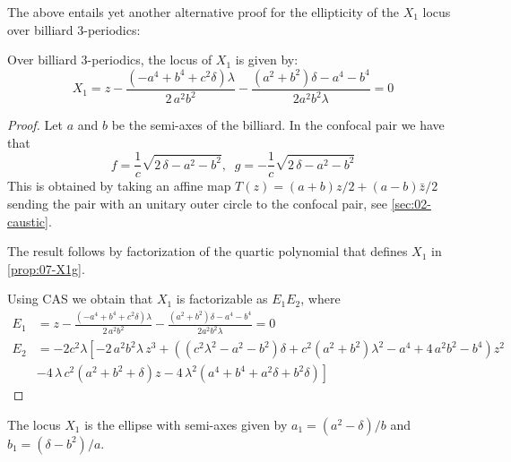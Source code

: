
The above entails yet another alternative proof for the ellipticity of the $X_1$ locus over billiard 3-periodics:

\begin{corollary}
Over billiard 3-periodics, the locus of $X_1$ is given by:
 \[   X_1 =z-{\frac { \left( -{a}^{4}+{b}^{4}+{c}^{2}\delta \right) \lambda}{2\,{a
}^{2}{b}^{2}}} -\frac{    ( a^2 + b^2)\delta -a^4 - b^4}{ 2 a^2 b^2 \lambda}=0
\]
\label{cor:07-X1q2} 
\end{corollary}

\begin{proof}
Let $a$ and $b$ be the semi-axes of the billiard. In the confocal pair 
we have that
\[f={\frac {1}{c}\sqrt { 2\,\delta-{a}^{2}-{b}^{2}}}, \;\; g= -{\frac {1}{c}\sqrt {2\,\delta-{a}^{2}-{b}^{2} }}\]
This is obtained by taking an affine map
$T(z)=(a+b)z/2+(a-b)\bar{z}/2$ sending the pair with an unitary outer circle to the confocal pair, see   \cref{sec:02-caustic}.  

The result follows by factorization of the quartic  polynomial that defines $X_1$ in \cref{prop:07-X1g}.

Using CAS we obtain that $X_1$ is factorizable as $E_1 E_2$, where
{\small  
\begin{align*}
    E_1&=z-{\frac { \left( -{a}^{4}+{b}^{4}+{c}^{2}\delta \right) \lambda}{2\,{a
}^{2}{b}^{2}}} -\frac{    ( a^2 + b^2)\delta -a^4 - b^4}{ 2 a^2 b^2 \lambda}=0
%
\\
    E_2&= -2c^2\lambda\left[-2\,{a}^{2}{b}^{2}\lambda\,{z}^{3}+ \left(  \left( {c}^{2}{\lambda}^{2
}-{a}^{2}-{b}^{2} \right) \delta+{c}^{2} \left( {a}^{2}+{b}^{2}
 \right) {\lambda}^{2}-{a}^{4}+4\,{a}^{2}{b}^{2}-{b}^{4} \right) {z}^{
2}\right.
\\
& \left.   -4\,\lambda\,{c}^{2} \left( {a}^{2}+{b}^{2}+\delta \right) z-4\,{
\lambda}^{2} \left( {a}^{4}+{b}^{4}+{a}^{2}\delta+{b}^{2}\delta
 \right) 
\right]
\end{align*}
}
\end{proof}

\begin{corollary}
The locus $X_1$ is the ellipse with semi-axes given by $a_1=(a^2-\delta)/b$ and $b_1=(\delta-b^2)/a.$

 
\end{corollary}

